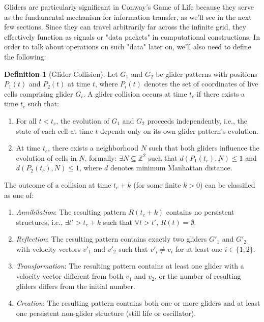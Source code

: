\documentclass{article}
\theoremstyle{definition}
\newtheorem{definition}{Definition}[section]
\theoremstyle{plain}
\theoremstyle{plain}
\begin{document}
Gliders are particularly significant in Conway's Game of Life because they serve as the fundamental mechanism for information transfer, as we'll see in the next few sections. Since they can travel arbitrarily far across the infinite grid, they effectively function as signals or "data packets" in computational constructions. In order to talk about operations on such "data" later on, we'll also need to define the following:

\begin{definition}[Glider Collision]
Let $G_1$ and $G_2$ be glider patterns with positions $P_1(t)$ and $P_2(t)$ at time $t$, where $P_i(t)$ denotes the set of coordinates of live cells comprising glider $G_i$. A glider collision occurs at time $t_c$ if there exists a time $t_c$ such that:
\begin{enumerate}
  \item For all $t < t_c$, the evolution of $G_1$ and $G_2$ proceeds independently, i.e., the state of each cell at time $t$ depends only on its own glider pattern's evolution.
  \item At time $t_c$, there exists a neighborhood $N$ such that both gliders influence the evolution of cells in $N$, formally: $\exists N \subseteq \mathbb{Z}^2$ such that $d(P_1(t_c), N) \leq 1$ and $d(P_2(t_c), N) \leq 1$, where $d$ denotes minimum Manhattan distance.
\end{enumerate}

The outcome of a collision at time $t_c+k$ (for some finite $k > 0$) can be classified as one of:
\begin{enumerate}
  \item \textit{Annihilation}: The resulting pattern $R(t_c+k)$ contains no persistent structures, i.e., $\exists t' > t_c+k$ such that $\forall t > t'$, $R(t) = \emptyset$.
  \item \textit{Reflection}: The resulting pattern contains exactly two gliders $G'_1$ and $G'_2$ with velocity vectors $v'_1$ and $v'_2$ such that $v'_i \neq v_i$ for at least one $i \in \{1,2\}$.
  \item \textit{Transformation}: The resulting pattern contains at least one glider with a velocity vector different from both $v_1$ and $v_2$, or the number of resulting gliders differs from the initial number.
  \item \textit{Creation}: The resulting pattern contains both one or more gliders and at least one persistent non-glider structure (still life or oscillator).
\end{enumerate}
\end{definition}
\end{document}
